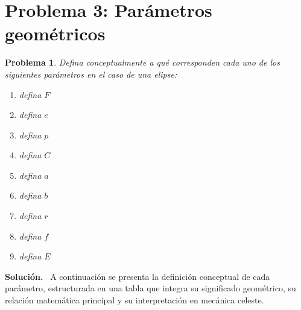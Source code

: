 \documentclass[11pt]{article}
\theoremstyle{prismstyle}
\newtheorem{problem}{Problema}
\newenvironment{solution}[1][Solución]
  {\par\textbf{#1.}\ }
  {\par}
\newcommand{\problemsection}[2]{
  \section{#1}
  \begin{problem}
  #2
  \end{problem}
}
\begin{document}
\problemsection{Problema 3: Parámetros geométricos}{
Defina conceptualmente a qué corresponden cada uno de los siguientes parámetros en el caso de una elipse:
\begin{enumerate}[label=\alph*)]
  \item defina $F$
  \item defina $e$
  \item defina $p$
  \item defina $C$
  \item defina $a$
  \item defina $b$
  \item defina $r$
  \item defina $f$
  \item defina $E$
\end{enumerate}
}

\begin{solution}
A continuación se presenta la definición conceptual de cada parámetro, estructurada en una tabla que integra su significado geométrico, su relación matemática principal y su interpretación en mecánica celeste.


\end{solution}
\end{document}
